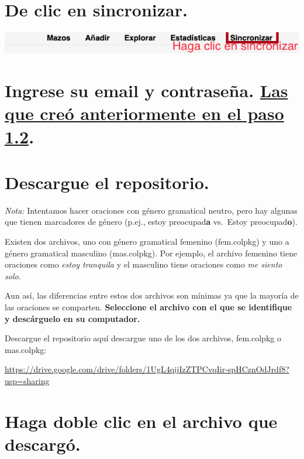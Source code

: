 \documentclass[
]{book}
\begin{document}
\hypertarget{de-clic-en-sincronizar.}{%
\section{De clic en sincronizar.}\label{de-clic-en-sincronizar.}}

\includegraphics[width=0.6\linewidth]{images/reposit_sp/clic_sincronizar}

\hypertarget{ingrese-su-email-y-contraseuxf1a.-las-que-creuxf3-anteriormente-en-el-paso-1.2.}{%
\section{\texorpdfstring{Ingrese su email y contraseña. \protect\hyperlink{cross_1}{Las que creó anteriormente en el paso 1.2}.}{Ingrese su email y contraseña. Las que creó anteriormente en el paso 1.2.}}\label{ingrese-su-email-y-contraseuxf1a.-las-que-creuxf3-anteriormente-en-el-paso-1.2.}}

\hypertarget{descargue-el-repositorio.}{%
\section{Descargue el repositorio.}\label{descargue-el-repositorio.}}

\emph{Nota:} Intentamos hacer oraciones con género gramatical neutro, pero hay algunas que tienen marcadores de género (p.ej., estoy preocupad\textbf{a} vs.~Estoy preocupad\textbf{o}).

Existen dos archivos, uno con género gramatical femenino (fem.colpkg) y uno a género gramatical masculino (mas.colpkg). Por ejemplo, el archivo femenino tiene oraciones como \emph{estoy tranquila} y el masculino tiene oraciones como \emph{me siento solo.}

Aun así, las diferencias entre estos dos archivos son mínimas ya que la mayoría de las oraciones se comparten. \textbf{Seleccione el archivo con el que se identifique y descárguelo en su computador.}

Descargue el repositorio aquí descargue uno de los dos archivos, fem.colpkg o mas.colpkg:

\url{https://drive.google.com/drive/folders/1UgL4qijIzZTPCvqIir-spHCznOdJrdf8?usp=sharing}

\hypertarget{haga-doble-clic-en-el-archivo-que-descarguxf3.}{%
\section{Haga doble clic en el archivo que descargó.}\label{haga-doble-clic-en-el-archivo-que-descarguxf3.}}
\end{document}
